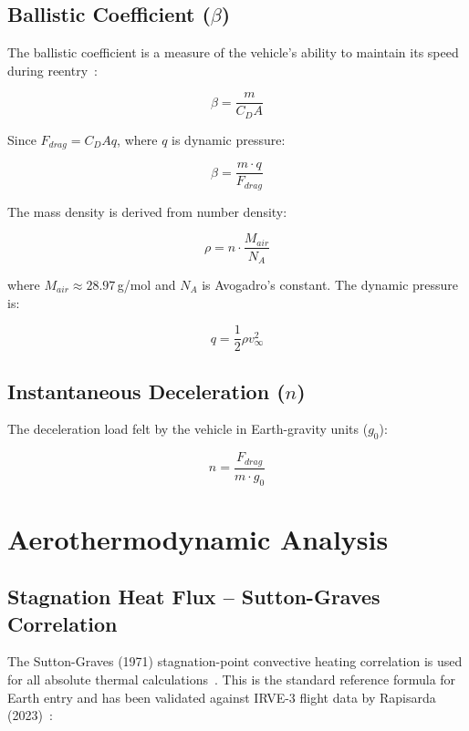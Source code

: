 \subsection{Ballistic Coefficient (\texorpdfstring{$\beta$}{beta})}
\label{sec:ballistic}
The ballistic coefficient is a measure of the vehicle's ability to maintain its speed during reentry~\cite{AndersonHypersonic}:

\begin{equation}
    \beta = \frac{m}{C_D A}
\end{equation}

Since $F_{drag} = C_D A q$, where $q$ is dynamic pressure:

\begin{equation}
    \beta = \frac{m \cdot q}{F_{drag}}
\end{equation}

The mass density is derived from number density:

\begin{equation}
    \rho = n \cdot \frac{M_{air}}{N_A}
\end{equation}

where $M_{air} \approx 28.97$\,g/mol and $N_A$ is Avogadro's constant. The dynamic pressure is:

\begin{equation}
    q = \frac{1}{2} \rho v_{\infty}^2
\end{equation}

\subsection{Instantaneous Deceleration (\texorpdfstring{$n$}{n})}
The deceleration load felt by the vehicle in Earth-gravity units ($g_0$):

\begin{equation}
    n = \frac{F_{drag}}{m \cdot g_0}
\end{equation}

\section{Aerothermodynamic Analysis}

\subsection{Stagnation Heat Flux -- Sutton-Graves Correlation}
The Sutton-Graves (1971) stagnation-point convective heating correlation is used for all absolute thermal calculations~\cite{sutton1971gravesh}. This is the standard reference formula for Earth entry and has been validated against IRVE-3 flight data by Rapisarda (2023)~\cite{rapisarda2023mdao}:

